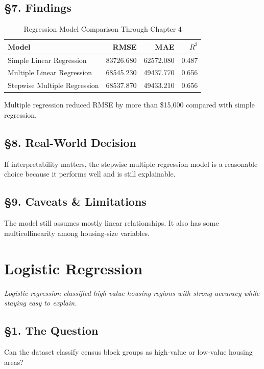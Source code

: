 \documentclass[12pt]{report}
\begin{document}
\section*{\S7. Findings}

\begin{table}[H]
\centering
\caption{Regression Model Comparison Through Chapter 4}
\begin{tabular}{lrrr}
\toprule
Model & RMSE & MAE & $R^2$ \\
\midrule
Simple Linear Regression & 83726.680 & 62572.080 & 0.487 \\
Multiple Linear Regression & 68545.230 & 49437.770 & 0.656 \\
Stepwise Multiple Regression & 68537.870 & 49433.210 & 0.656 \\
\bottomrule
\end{tabular}
\end{table}

Multiple regression reduced RMSE by more than \$15,000 compared with simple regression.

\section*{\S8. Real-World Decision}
If interpretability matters, the stepwise multiple regression model is a reasonable choice because it performs well and is still explainable.

\section*{\S9. Caveats \& Limitations}
The model still assumes mostly linear relationships. It also has some multicollinearity among housing-size variables.

\newpage

\chapter{Logistic Regression}

\begin{center}
\textit{Logistic regression classified high-value housing regions with strong accuracy while staying easy to explain.}
\end{center}

\section*{\S1. The Question}
Can the dataset classify census block groups as high-value or low-value housing areas?
\end{document}
